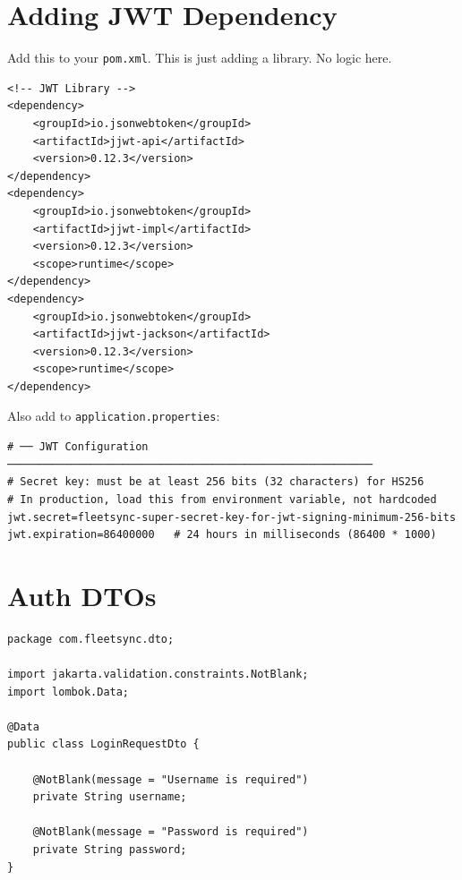 \documentclass[12pt,a4paper]{report}
\newcommand{\file}[1]{\texttt{\textcolor{successgreen}{#1}}}
\begin{document}
\section{Adding JWT Dependency}

\begin{tcolorbox}[aibox]
Add this to your \file{pom.xml}. This is just adding a library. No logic here.
\end{tcolorbox}

\begin{lstlisting}[style=xmlstyle,caption=Add to pom.xml dependencies section]
<!-- JWT Library -->
<dependency>
    <groupId>io.jsonwebtoken</groupId>
    <artifactId>jjwt-api</artifactId>
    <version>0.12.3</version>
</dependency>
<dependency>
    <groupId>io.jsonwebtoken</groupId>
    <artifactId>jjwt-impl</artifactId>
    <version>0.12.3</version>
    <scope>runtime</scope>
</dependency>
<dependency>
    <groupId>io.jsonwebtoken</groupId>
    <artifactId>jjwt-jackson</artifactId>
    <version>0.12.3</version>
    <scope>runtime</scope>
</dependency>
\end{lstlisting}

Also add to \file{application.properties}:

\begin{lstlisting}[style=xmlstyle,caption=JWT Config in application.properties]
# ── JWT Configuration ─────────────────────────────────────────────────────────
# Secret key: must be at least 256 bits (32 characters) for HS256
# In production, load this from environment variable, not hardcoded
jwt.secret=fleetsync-super-secret-key-for-jwt-signing-minimum-256-bits
jwt.expiration=86400000   # 24 hours in milliseconds (86400 * 1000)
\end{lstlisting}

\section{Auth DTOs}

\begin{lstlisting}[caption=LoginRequestDto.java]
package com.fleetsync.dto;

import jakarta.validation.constraints.NotBlank;
import lombok.Data;

@Data
public class LoginRequestDto {

    @NotBlank(message = "Username is required")
    private String username;

    @NotBlank(message = "Password is required")
    private String password;
}
\end{lstlisting}
\end{document}
